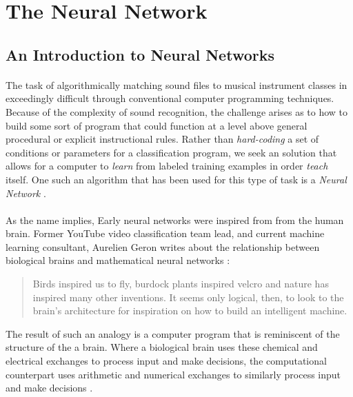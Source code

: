 \documentclass[12pt,letterpaper]{article}
\begin{document}

\newpage
\section{The Neural Network}
\label{sec-TheNeuralNetwork}


\subsection{An Introduction to Neural Networks}
\label{subsec-NerualNetworkIntro}

\paragraph*{}The task of algorithmically matching sound files to musical instrument classes in exceedingly difficult through conventional computer programming techniques. Because of the complexity of sound recognition, the challenge arises as to how to build some sort of program that could function at a level above general procedural or explicit instructional rules. Rather than \textit{hard-coding} a set of conditions or parameters for a classification program, we seek an solution that allows for a computer to \textit{learn} from labeled training examples in order \textit{teach} itself. One such an algorithm that has been used for this type of task is a \textit{Neural Network} \cite{Geron2,Goodfellow,Levine,Virtanen}.

\paragraph*{}As the name implies, Early neural networks were inspired from from the human brain. Former YouTube video classification team lead, and current machine learning consultant, Aurelien Geron writes about the relationship between biological brains and mathematical neural networks \cite{Geron}: 
\begin{quote}
Birds inspired us to fly, burdock plants inspired velcro and nature has inspired many other inventions. It seems only logical, then, to look to the brain's architecture for inspiration on how to build an intelligent machine.
\end{quote}
The result of such an analogy is a computer program that is reminiscent of the structure of the a brain. Where a biological brain uses these chemical and electrical exchanges to process input and make decisions, the computational counterpart uses arithmetic and numerical exchanges to similarly process input and make decisions \cite{Geron,Levine}. 
\end{document}
